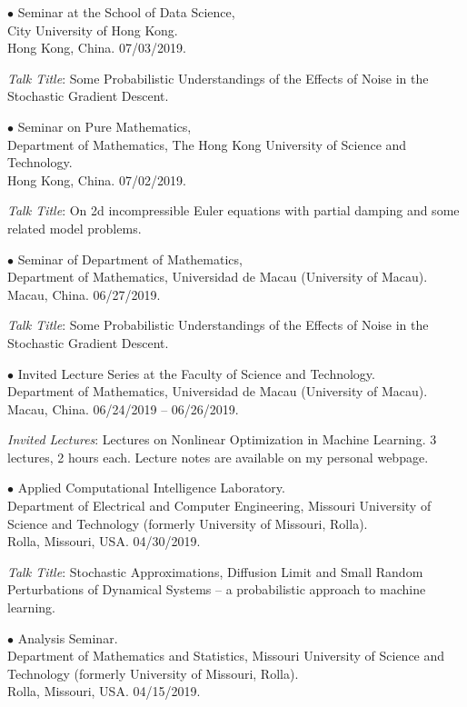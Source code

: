 \documentclass[margin,line]{res}
\begin{document}
\begin{resume}
{$\bullet$ Seminar at the School of Data Science,
\\
City University of Hong Kong. \\
Hong Kong, China.} \hfill 07/03/2019.

\textit{Talk Title}: Some Probabilistic Understandings of the Effects of Noise in the Stochastic Gradient Descent.

{$\bullet$ Seminar on Pure Mathematics,
\\
Department of Mathematics, The Hong Kong University of Science and Technology. \\
Hong Kong, China.} \hfill 07/02/2019.

\textit{Talk Title}: On 2d incompressible Euler equations with partial damping and some related model problems.

{$\bullet$ Seminar of Department of Mathematics,
\\
Department of Mathematics, Universidad de Macau (University of Macau). \\
Macau, China.} \hfill 06/27/2019.

\textit{Talk Title}: Some Probabilistic Understandings of the Effects of Noise in the Stochastic Gradient Descent.

{$\bullet$ Invited Lecture Series at the Faculty of Science and Technology. \\ Department of Mathematics, Universidad de Macau (University of Macau). \\
Macau, China.} \hfill 06/24/2019 -- 06/26/2019.

\textit{Invited Lectures}: Lectures on Nonlinear Optimization in Machine Learning. 3
lectures, 2 hours each. Lecture notes are available on my personal
webpage.

{$\bullet$ Applied Computational Intelligence Laboratory. \\ Department of Electrical and Computer Engineering,
Missouri University of Science and Technology (formerly University of Missouri, Rolla). \\
Rolla, Missouri, USA.} \hfill 04/30/2019.

\textit{Talk Title}: Stochastic Approximations, Diffusion Limit and Small Random Perturbations of Dynamical Systems -- a probabilistic approach to machine learning.

{$\bullet$ Analysis Seminar. \\ Department of Mathematics and Statistics,
Missouri University of Science and Technology (formerly University of Missouri, Rolla). \\
Rolla, Missouri, USA.} \hfill 04/15/2019.


\end{resume}
\end{document}
